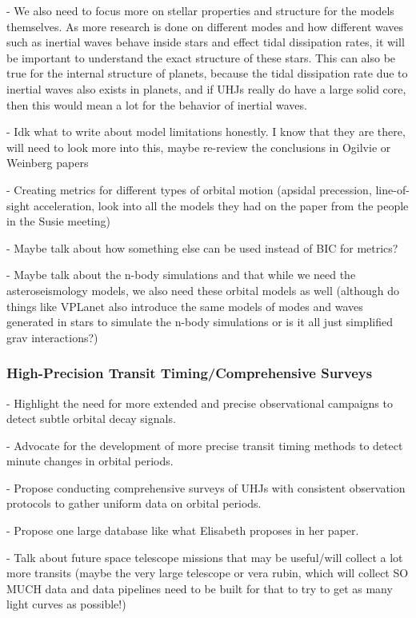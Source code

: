 \documentclass[oneside,12pt]{amsart}
\numberwithin{page}{section}
\begin{document}
- We also need to focus more on stellar properties and structure for the models themselves. As more research is done on different modes and how different waves such as inertial waves behave inside stars and effect tidal dissipation rates, it will be important to understand the exact structure of these stars. This can also be true for the internal structure of planets, because the tidal dissipation rate due to inertial waves also exists in planets, and if UHJs really do have a large solid core, then this would mean a lot for the behavior of inertial waves. 

- Idk what to write about model limitations honestly. I know that they are there, will need to look more into this, maybe re-review the conclusions in Ogilvie or Weinberg papers

- Creating metrics for different types of orbital motion (apsidal precession, line-of-sight acceleration, look into all the models they had on the paper from the people in the Susie meeting)

- Maybe talk about how something else can be used instead of BIC for metrics?

- Maybe talk about the n-body simulations and that while we need the asteroseismology models, we also need these orbital models as well (although do things like VPLanet also introduce the same models of modes and waves generated in stars to simulate the n-body simulations or is it all just simplified grav interactions?)

\subsubsection{High-Precision Transit Timing/Comprehensive Surveys}
- Highlight the need for more extended and precise observational campaigns to detect subtle orbital decay signals.

- Advocate for the development of more precise transit timing methods to detect minute changes in orbital periods.

- Propose conducting comprehensive surveys of UHJs with consistent observation protocols to gather uniform data on orbital periods.

- Propose one large database like what Elisabeth proposes in her paper.

- Talk about future space telescope missions that may be useful/will collect a lot more transits (maybe the very large telescope or vera rubin, which will collect SO MUCH data and data pipelines need to be built for that to try to get as many light curves as possible!)
\end{document}
